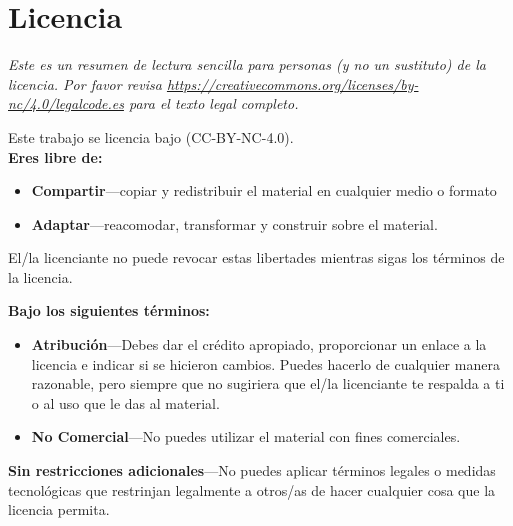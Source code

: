 \chapter{Licencia}\label{s:license}

{\setlength{\parindent}{0em}

\emph{
  Este es un resumen de lectura sencilla para personas (y no un sustituto) de la licencia.
  Por favor revisa \url{https://creativecommons.org/licenses/by-nc/4.0/legalcode.es} para el texto legal completo.
}

\vspace{\baselineskip}

\noindent
Este trabajo se licencia bajo
(CC-BY-NC-4.0).\\

\noindent
\textbf{Eres libre de:}

\begin{itemize}
\item
  \textbf{Compartir}---copiar y redistribuir el material en cualquier medio o
  formato
\item
  \textbf{Adaptar}---reacomodar, transformar y construir sobre el material.
\end{itemize}

El/la licenciante no puede revocar estas libertades mientras sigas los
términos de la licencia.

\vspace{\baselineskip}

\textbf{Bajo los siguientes términos:}

\begin{itemize}
\item
  \textbf{Atribución}---Debes dar el crédito apropiado, proporcionar un enlace
  a la licencia e indicar si se hicieron cambios. Puedes hacerlo de cualquier manera
  razonable, pero siempre que no sugiriera que el/la licenciante te respalda 
  a ti o al uso que le das al material.\\
\item
  \textbf{No Comercial}---No puedes utilizar el material con fines comerciales.
\end{itemize}

\textbf{Sin restricciones adicionales}---No puedes aplicar términos legales o
medidas tecnológicas que restrinjan legalmente a otros/as de hacer cualquier cosa
que la licencia permita.

\vspace{\baselineskip}

}
